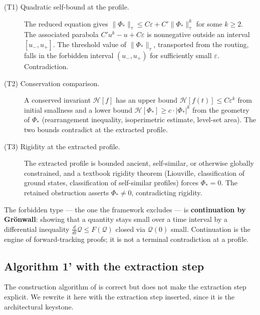 \documentclass[11pt]{article}
\theoremstyle{plain}
\theoremstyle{definition}
\theoremstyle{remark}
\begin{document}
\begin{description}
\item[\textup{(T1)} Quadratic self-bound at the profile.]
The reduced equation gives \(\|\Phi_*\|_\tau \leq C\varepsilon + C'\|\Phi_*\|_\tau^k\) for some \(k \geq 2\). The
associated parabola \(C'u^k - u + C\varepsilon\) is nonnegative outside an
interval \([u_-, u_+]\). The threshold value of \(\|\Phi_*\|_\tau\),
transported from the routing, falls in the forbidden interval \((u_-, u_+)\)
for sufficiently small \(\varepsilon\). Contradiction.

\item[\textup{(T2)} Conservation comparison.]
A conserved invariant \(\mathcal{H}[f]\) has an upper bound
\(\mathcal{H}[f(t)] \leq C\varepsilon^k\) from initial smallness and a lower
bound \(\mathcal{H}[\Phi_*] \geq c \cdot |\Phi_*|^k\) from the geometry of
\(\Phi_*\) (rearrangement inequality, isoperimetric estimate, level-set area).
The two bounds contradict at the extracted profile.

\item[\textup{(T3)} Rigidity at the extracted profile.]
The extracted profile is bounded ancient, self-similar, or otherwise globally
constrained, and a textbook rigidity theorem (Liouville, classification of
ground states, classification of self-similar profiles) forces \(\Phi_* = 0\).
The retained obstruction asserts \(\Phi_* \neq 0\), contradicting rigidity.
\end{description}

The forbidden type — the one the framework excludes — is \textbf{continuation
by Grönwall}: showing that a quantity stays small over a time interval by a
differential inequality \(\frac{d}{dt}\mathcal{Q} \leq F(\mathcal{Q})\) closed
via \(\mathcal{Q}(0)\) small. Continuation is the engine of forward-tracking
proofs; it is not a terminal contradiction at a profile.

\subsection{Algorithm 1' with the extraction step}
\label{subsec:algorithm-extraction}

The construction algorithm of  is
correct but does not make the extraction step explicit. We rewrite it here with
the extraction step inserted, since it is the architectural keystone.
\end{document}
